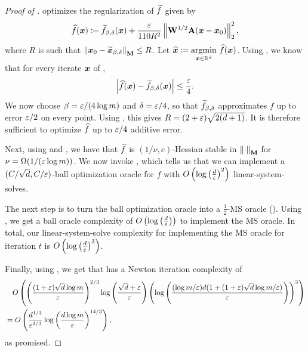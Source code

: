 \begin{proof}[Proof of ]
 optimizes the regularization of $\widetilde{f}$ given by
\begin{align*}
    \widehat{f}(\bm{x}) \coloneqq \widetilde{f}_{\beta,\delta}(\bm{x}) + \frac{\varepsilon}{110R^2}\left\lVert \mathbf{W}^{1/2}\mathbf{A}(\bm{x}-\bm{x}_0) \right\rVert_2^2,
\end{align*}
where $R$ is such that $\left\lVert \bm{x}_0 - \widetilde{\bm{x}}_{\beta,\delta} \right\rVert_{\mathbf{M}} \le R$. Let $ \widehat{\bm{x}} \coloneqq \underset{\bm{x}\in\mathbb{R}^d}{\mathrm{argmin}}\  \widehat{f}(\bm{x})$. Using \cite[Proof of Corollary 12]{msbacon}, we know that for every iterate $\bm{x}$ of ,
\begin{align*}
    \left\lvert \widehat{f}(\bm{x})-\widetilde{f}_{\beta,\delta}(\bm{x}) \right\rvert \le \frac{\varepsilon}{4}.
\end{align*}
We now choose $\beta = \varepsilon/(4\log m)$ and $\delta = \varepsilon/4$, so that $\widetilde{f}_{\beta,\delta}$ approximates $f$ up to error $\varepsilon/2$ on every point. Using , this gives $R = (2+\varepsilon)\sqrt{2(d+1)}$. It is therefore sufficient to optimize $\widehat{f}$ up to $\varepsilon/4$ additive error.

Next, using  and \cite[Lemmas 11, 43]{msbacon}, we have that $\widehat{f}$ is $(1/\nu, e)$-Hessian stable in $\left\lVert \cdot \right\rVert_{\mathbf{M}}$ for $\nu = \Omega(1/(\varepsilon\log m))$. We now invoke \cite[Theorem 9]{msbacon}, which tells us that we can implement a $(C/\sqrt{d}, C/\varepsilon)$-ball optimization oracle for $f$ with $O\left(\log\left(\frac{d}{\varepsilon}\right)^2\right)$ linear-system-solves. 

The next step is to turn the ball optimization oracle into a $\frac{1}{2}$-MS oracle (). Using \cite[Proposition 5]{msbacon}, we get a ball oracle complexity of $O\left(\log\left(\frac{d}{\varepsilon}\right)\right)$ to implement the MS oracle. In total, our linear-system-solve complexity for implementing the MS oracle for iteration $t$ is $O\left(\log\left(\frac{d}{\varepsilon}\right)^3\right)$.

Finally, using \cite[Theorem 6]{msbacon}, we get that  has a Newton iteration complexity of
\begin{align*}
    &\quad O\left(\left(\frac{(1+\varepsilon)\sqrt{d}\log m}{\varepsilon}\right)^{2/3}\log\left(\frac{\sqrt{d}+\varepsilon}{\varepsilon}\right)\left(\log\left(\frac{(\log m/\varepsilon)d(1+(1+\varepsilon)\sqrt{d}\log m/\varepsilon)}{\varepsilon}\right)\right)^3\right) \\
    &= O\left(\frac{d^{1/3}}{\varepsilon^{2/3}}\log\left(\frac{d\log m}{\varepsilon}\right)^{14/3}\right),
\end{align*}
as promised.


\end{proof}
